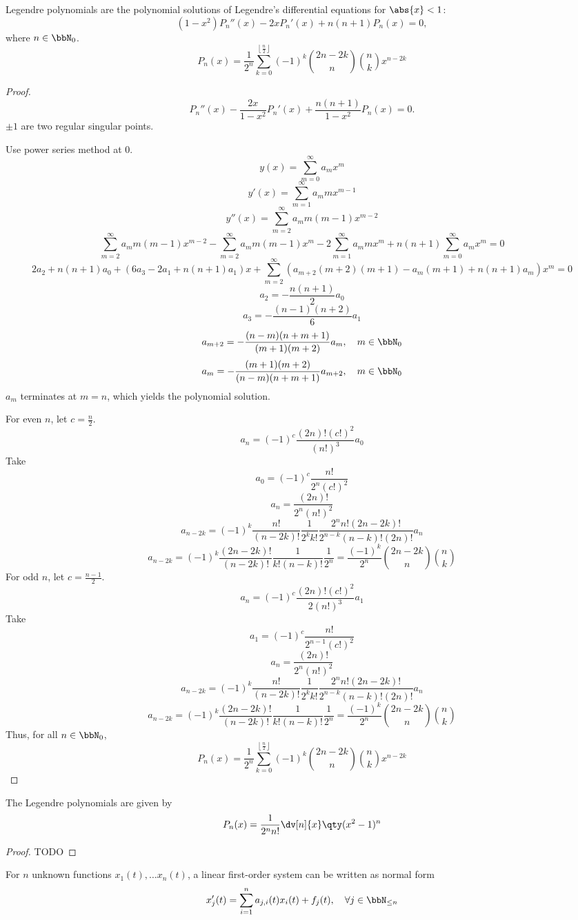 \documentclass[a4paper,12pt]{report}
\begin{document}
\epr
{}
Legendre polynomials are the polynomial solutions of Legendre's differential equations for $\abs{x}<1$:
\[(1-x^2)P_n''(x)-2xP_n'(x)+n(n+1)P_n(x)=0,\]
where $n\in\bbN_0$.
\[P_n(x)=\frac{1}{2^n}\sum_{k=0}^{\left\lfloor\frac{n}{2}\right\rfloor}(-1)^k\binom{2n-2k}{n}\binom{n}{k}x^{n-2k}\]
\begin{proof}
\[P_n''(x)-\frac{2x}{1-x^2}P_n'(x)+\frac{n(n+1)}{1-x^2}P_n(x)=0.\]
\(\pm 1\) are two regular singular points.

Use power series method at $0$.
\[y(x)=\sum_{m=0}^{\infty}a_mx^m\]
\[y'(x)=\sum_{m=1}^{\infty}a_mmx^{m-1}\]
\[y''(x)=\sum_{m=2}^{\infty}a_mm(m-1)x^{m-2}\]
\[\sum_{m=2}^{\infty}a_mm(m-1)x^{m-2}-\sum_{m=2}^{\infty}a_mm(m-1)x^m-2\sum_{m=1}^{\infty}a_mmx^m+n(n+1)\sum_{m=0}^{\infty}a_mx^m=0\]
\[2a_2+n(n+1)a_0+(6a_3-2a_1+n(n+1)a_1)x+\sum_{m=2}^{\infty}(a_{m+2}(m+2)(m+1)-a_m(m+1)+n(n+1)a_m)x^m=0\]
\[a_2=-\frac{n(n+1)}{2}a_0\]
\[a_3=-\frac{(n-1)(n+2)}{6}a_1\]
\[a_{m+2}=-\frac{(n-m)(n+m+1)}{(m+1)(m+2)}a_m,\quad m\in\bbN_0\]
\[a_m=-\frac{(m+1)(m+2)}{(n-m)(n+m+1)}a_{m+2},\quad m\in\bbN_0\]
$a_m$ terminates at $m=n$, which yields the polynomial solution.

For even $n$, let $c=\frac{n}{2}$.
\[a_n=(-1)^c\frac{(2n)!(c!)^2}{(n!)^3}a_0\]
Take
\[a_0=(-1)^c\frac{n!}{2^n(c!)^2}\]
\[a_n=\frac{(2n)!}{2^n(n!)^2}\]
\[a_{n-2k}=(-1)^k\frac{n!}{(n-2k)!}\frac{1}{2^kk!}\frac{2^nn!(2n-2k)!}{2^{n-k}(n-k)!(2n)!}a_n\]
\[a_{n-2k}=(-1)^k\frac{(2n-2k)!}{(n-2k)!}\frac{1}{k!(n-k)!}\frac{1}{2^n}=\frac{(-1)^k}{2^n}\binom{2n-2k}{n}\binom{n}{k}\]
For odd $n$, let $c=\frac{n-1}{2}$.
\[a_n=(-1)^c\frac{(2n)!(c!)^2}{2(n!)^3}a_1\]
Take
\[a_1=(-1)^c\frac{n!}{2^{n-1}(c!)^2}\]
\[a_n=\frac{(2n)!}{2^n(n!)^2}\]
\[a_{n-2k}=(-1)^k\frac{n!}{(n-2k)!}\frac{1}{2^kk!}\frac{2^nn!(2n-2k)!}{2^{n-k}(n-k)!(2n)!}a_n\]
\[a_{n-2k}=(-1)^k\frac{(2n-2k)!}{(n-2k)!}\frac{1}{k!(n-k)!}\frac{1}{2^n}=\frac{(-1)^k}{2^n}\binom{2n-2k}{n}\binom{n}{k}\]
Thus, for all $n\in\bbN_0$,
\[P_n(x)=\frac{1}{2^n}\sum_{k=0}^{\left\lfloor\frac{n}{2}\right\rfloor}(-1)^k\binom{2n-2k}{n}\binom{n}{k}x^{n-2k}\]
\end{proof}
The Legendre polynomials are given by
\[P_n(x)=\frac{1}{2^nn!}\dv[n]{x}\qty(x^2-1)^n\]
\begin{proof}
TODO 
\end{proof}
For $n$ unknown functions $x_1(t),\ldots x_n(t)$, a linear first-order system can be written as normal form
\[x_j'(t)=\sum_{i=1}^na_{j,i}(t)x_i(t)+f_j(t),\quad\forall j\in\bbN_{\le n}\]
\end{document}
